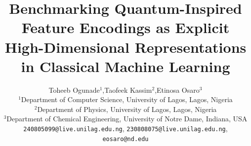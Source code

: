 \documentclass[12pt]{article}
\title{%
  \textbf{Benchmarking Quantum-Inspired Feature Encodings as Explicit
  High-Dimensional Representations in Classical Machine Learning}%
}
\author{%
  Toheeb Ogunade$^{1}$,\quad Taofeek Kassim$^{2}$,\quad Etinosa Osaro$^{3}$\\[0.5em]
  \small$^{1}$Department of Computer Science, University of Lagos, Lagos, Nigeria\\
  \small$^{2}$Department of Physics, University of Lagos, Lagos, Nigeria\\
  \small$^{3}$Department of Chemical Engineering, University of Notre Dame, Indiana, USA\\[0.3em]
  \small\texttt{240805099@live.unilag.edu.ng},\quad
  \texttt{230808075@live.unilag.edu.ng},\quad
  \texttt{eosaro@nd.edu}
}
\date{}
\begin{document}
\maketitle

\begin{abstract}

\end{abstract}












\appendix

\end{document}
